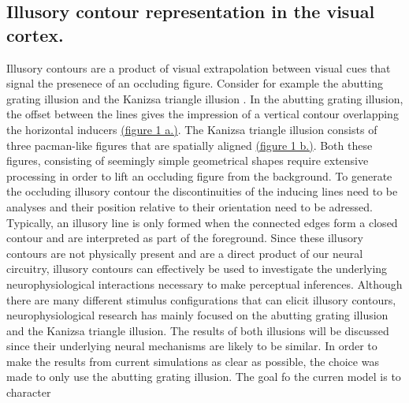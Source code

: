 \documentclass[12pt]{article}
\begin{document}
\subsection{Illusory contour representation in the visual cortex.}
Illusory contours are a product of visual extrapolation between visual cues that signal the presenece of an occluding figure. Consider for example the abutting grating illusion \autocite{sorianoAbuttingGratingIllusion1996} and the Kanizsa triangle illusion \autocite{kanizsaSubjectiveContours1976}. In the abutting grating illusion, the offset between the lines gives the impression of a vertical contour overlapping the horizontal inducers \hyperref[fig:figure_1]{(figure 1 a.)}. The Kanizsa triangle illusion consists of three pacman-like figures that are spatially aligned \hyperref[fig:figure_1]{(figure 1 b.)}. Both these figures, consisting of seemingly simple geometrical shapes require extensive processing in order to lift an occluding figure from the background. To generate the occluding illusory contour the discontinuities of the inducing lines need to be analyses and their position relative to their orientation need to be adressed. Typically, an illusory line is only formed when the connected edges form a closed contour and are interpreted as part of the foreground. Since these illusory contours are not physically present and are a direct product of our neural circuitry, illusory contours can  effectively be used to investigate the underlying neurophysiological interactions necessary to make perceptual inferences. Although there are many different stimulus configurations  that can elicit illusory contours, neurophysiological research has mainly focused on the abutting grating illusion and the Kanizsa triangle illusion. The results of both illusions will be discussed since their underlying neural mechanisms are likely to be similar. In order to make the results from current simulations as clear as possible, the choice was made to only use the abutting grating illusion. The goal fo the curren model is to character
\end{document}
